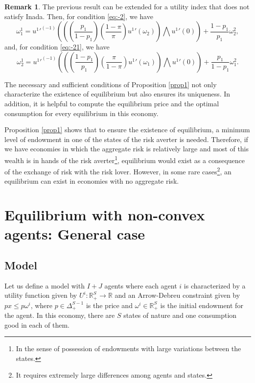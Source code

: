 \documentclass[pdftex]{article}
\numberwithin{equation}{section}
\theoremstyle{th}
\newtheorem{proof lemma}{{Proof Lemma}.}
\theoremstyle{definition}
\newtheorem{remark}{Remark}%
\begin{document}
\begin{remark}
\label{remarknoInada}The previous result can be extended for a utility index that does not satisfy Inada. Then, for condition \ref{eq:-2}, we have 
\begin{equation}
\label{eq:-2n}
\omega_1^1={{u^1}'}^{(-1)}\left(\left(\left(\frac{p_1}{1-p_1}\right)\left(\frac{1-\pi}{\pi}\right){u^1}'\left(\omega_2\right)\right)\bigwedge{{u^1}'}(0)\right)+\frac{1-p_1}{p_1}\omega_2^2,
\end{equation}
 and, for condition \ref{eq:-21}, we have 
 \begin{equation}
 \label{eq:-21n}
 \omega_2^1={{u^1}'}^{(-1)}\left(\left(\left(\frac{1-p_1}{p_1}\right)\left(\frac{\pi}{1-\pi}\right){u^1}'\left(\omega_1\right)\right)\bigwedge{{u^1}'}(0)\right)+\frac{p_1}{1-p_1}\omega_1^2.
 \end{equation}
\end{remark}



The necessary and sufficient conditions of Proposition \ref{prop1} not only characterize the existence of equilibrium but also ensures its uniqueness. In addition, it is helpful to compute the equilibrium price and the optimal consumption for every equilibrium in this economy.

Proposition \ref{prop1} shows that to ensure the existence of equilibrium, a minimum level of endowment in one of the states of the risk averter is needed. Therefore, if we have economies in which the aggregate risk is relatively large and most of this wealth is in hands of the risk averter\footnote{In the sense of possession of endowments with large variations between the states.}, equilibrium would exist as a consequence of the exchange of risk with the risk lover. However, in some rare cases\footnote{It requires extremely large differences among agents and states.}, an equilibrium can exist in economies with no aggregate risk. 






\section{Equilibrium with non-convex agents: General case}
\label{section2}
\subsection{Model}
Let us define a model with $I+J$ agents where each agent $i$ is characterized by a utility function given by $U^i:\mathbb{R}^S_+\rightarrow\mathbb{R}$ and an Arrow-Debreu constraint given by $px\leq{p}\omega^i$, where $p\in\Delta^{S-1}_+$ is the price and $\omega^i\in \mathbb{R}^S_+$ is the initial endowment for the agent. In this economy, there are $S$ states of nature and one consumption good in each of them.
\end{document}
